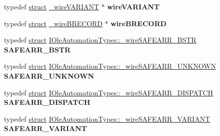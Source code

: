 \begin{DoxyCompactItemize}
\item 
\mbox{\label{interface_i_ole_automation_types_ab458f207d19bf71d9a526e029cddb1a7}} 
typedef \hyperlink{interfacestruct}{struct} \hyperlink{struct_i_ole_automation_types_1_1__wire_v_a_r_i_a_n_t}{\+\_\+wire\+V\+A\+R\+I\+A\+NT} $\ast$ {\bfseries wire\+V\+A\+R\+I\+A\+NT}
\item 
\mbox{\label{interface_i_ole_automation_types_aa7d491b9d17b0c3b1a885724c5f2aecf}} 
typedef \hyperlink{interfacestruct}{struct} \hyperlink{struct_i_ole_automation_types_1_1__wire_b_r_e_c_o_r_d}{\+\_\+wire\+B\+R\+E\+C\+O\+RD} $\ast$ {\bfseries wire\+B\+R\+E\+C\+O\+RD}
\item 
\mbox{\label{interface_i_ole_automation_types_ac652438a7980f23575a9680999c752e1}} 
typedef \hyperlink{interfacestruct}{struct} \hyperlink{struct_i_ole_automation_types_1_1__wire_s_a_f_e_a_r_r___b_s_t_r}{I\+Ole\+Automation\+Types\+::\+\_\+wire\+S\+A\+F\+E\+A\+R\+R\+\_\+\+B\+S\+TR} {\bfseries S\+A\+F\+E\+A\+R\+R\+\_\+\+B\+S\+TR}
\item 
\mbox{\label{interface_i_ole_automation_types_ab97ef979544680cf3c19f3bb0af83d63}} 
typedef \hyperlink{interfacestruct}{struct} \hyperlink{struct_i_ole_automation_types_1_1__wire_s_a_f_e_a_r_r___u_n_k_n_o_w_n}{I\+Ole\+Automation\+Types\+::\+\_\+wire\+S\+A\+F\+E\+A\+R\+R\+\_\+\+U\+N\+K\+N\+O\+WN} {\bfseries S\+A\+F\+E\+A\+R\+R\+\_\+\+U\+N\+K\+N\+O\+WN}
\item 
\mbox{\label{interface_i_ole_automation_types_a242a8b4e81fd5193b52b8d3cd5dbe616}} 
typedef \hyperlink{interfacestruct}{struct} \hyperlink{struct_i_ole_automation_types_1_1__wire_s_a_f_e_a_r_r___d_i_s_p_a_t_c_h}{I\+Ole\+Automation\+Types\+::\+\_\+wire\+S\+A\+F\+E\+A\+R\+R\+\_\+\+D\+I\+S\+P\+A\+T\+CH} {\bfseries S\+A\+F\+E\+A\+R\+R\+\_\+\+D\+I\+S\+P\+A\+T\+CH}
\item 
\mbox{\label{interface_i_ole_automation_types_ad2132e210bb936cbed01fda834ca9e4c}} 
typedef \hyperlink{interfacestruct}{struct} \hyperlink{struct_i_ole_automation_types_1_1__wire_s_a_f_e_a_r_r___v_a_r_i_a_n_t}{I\+Ole\+Automation\+Types\+::\+\_\+wire\+S\+A\+F\+E\+A\+R\+R\+\_\+\+V\+A\+R\+I\+A\+NT} {\bfseries S\+A\+F\+E\+A\+R\+R\+\_\+\+V\+A\+R\+I\+A\+NT}

\end{DoxyCompactItemize}
